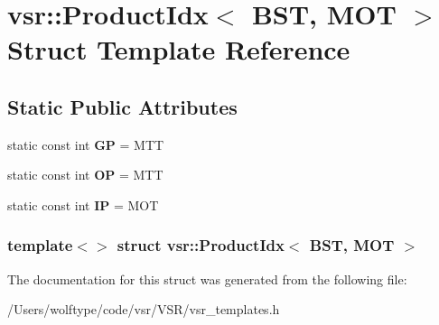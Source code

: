 \hypertarget{structvsr_1_1_product_idx_3_01_b_s_t_00_01_m_o_t_01_4}{\section{vsr\-:\-:Product\-Idx$<$ B\-S\-T, M\-O\-T $>$ Struct Template Reference}
\label{structvsr_1_1_product_idx_3_01_b_s_t_00_01_m_o_t_01_4}
}
\subsection*{Static Public Attributes}
\begin{DoxyCompactItemize}
\item 
\hypertarget{structvsr_1_1_product_idx_3_01_b_s_t_00_01_m_o_t_01_4_af2c91cb7be4d83a7f7efa219256f2c7f}{static const int {\bfseries G\-P} = M\-T\-T}\label{structvsr_1_1_product_idx_3_01_b_s_t_00_01_m_o_t_01_4_af2c91cb7be4d83a7f7efa219256f2c7f}

\item 
\hypertarget{structvsr_1_1_product_idx_3_01_b_s_t_00_01_m_o_t_01_4_adc91176de14380eb1ea2d45e4d64d11a}{static const int {\bfseries O\-P} = M\-T\-T}\label{structvsr_1_1_product_idx_3_01_b_s_t_00_01_m_o_t_01_4_adc91176de14380eb1ea2d45e4d64d11a}

\item 
\hypertarget{structvsr_1_1_product_idx_3_01_b_s_t_00_01_m_o_t_01_4_ad13138d02d6785fc8494054bd29dd7d0}{static const int {\bfseries I\-P} = M\-O\-T}\label{structvsr_1_1_product_idx_3_01_b_s_t_00_01_m_o_t_01_4_ad13138d02d6785fc8494054bd29dd7d0}

\end{DoxyCompactItemize}
\subsubsection*{template$<$$>$ struct vsr\-::\-Product\-Idx$<$ B\-S\-T, M\-O\-T $>$}



The documentation for this struct was generated from the following file\-:\begin{DoxyCompactItemize}
\item 
/\-Users/wolftype/code/vsr/\-V\-S\-R/vsr\-\_\-templates.\-h\end{DoxyCompactItemize}
